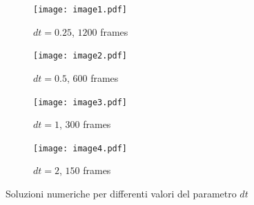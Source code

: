 \begin{figure}[H]
 \begin{subfigure}[b]{0.5\textwidth}
  \centering
  \texttt{[image: image1.pdf]}
  \caption{$dt=0.25$, $1200$ frames}
  \label{fig:image1}
 \end{subfigure}
 \begin{subfigure}[b]{0.5\textwidth}
  \centering
  \texttt{[image: image2.pdf]}
  \caption{$dt=0.5$, $600$ frames}
  \label{fig:image2}
 \end{subfigure}

 \quad

 \begin{subfigure}[b]{0.5\textwidth}
  \centering
  \texttt{[image: image3.pdf]}
  \caption{$dt=1$, $300$ frames}
  \label{fig:image3}
 \end{subfigure}
 \begin{subfigure}[b]{0.5\textwidth}
  \centering
  \texttt{[image: image4.pdf]}
  \caption{$dt=2$, $150$ frames}
  \label{fig:image4}
 \end{subfigure}

 \caption{Soluzioni numeriche per differenti valori del parametro $dt$}\label{fig:images_dt}
\end{figure}

